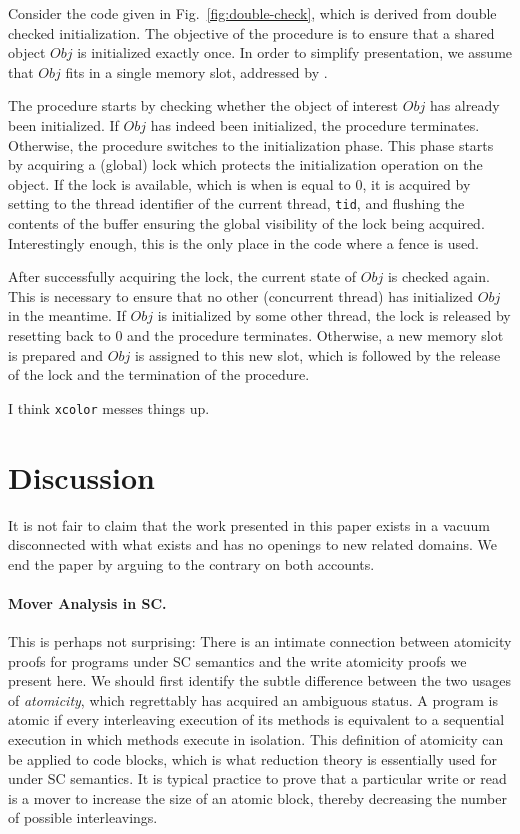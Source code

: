 \documentclass[preprint,9pt]{sigplanconf}
\begin{document}
Consider the code given in Fig.~\ref{fig:double-check}, which is derived from double checked initialization.
The objective of the procedure is to ensure that a shared object $Obj$ is initialized exactly once.
In order to simplify presentation, we assume that $Obj$ fits in a single memory slot, addressed by {}.

The procedure starts by checking whether the object of interest $Obj$ has already been initialized.
If $Obj$ has indeed been initialized, the procedure terminates.
Otherwise, the procedure switches to the initialization phase.
This phase starts by acquiring a (global) lock which protects the initialization operation on the object.
If the lock is available, which is when {} is equal to 0, it is acquired by setting {} to the thread identifier of the current thread, {\tt tid}, and flushing the contents of the buffer ensuring the global visibility of the lock being acquired.
Interestingly enough, this is the only place in the code where a fence is used.

After successfully acquiring the lock, the current state of $Obj$ is checked again.
This is necessary to ensure that no other (concurrent thread) has initialized $Obj$ in the meantime.
If $Obj$ is initialized by some other thread, the lock is released by resetting {} back to 0 and the procedure terminates.
Otherwise, a new memory slot is prepared and $Obj$ is assigned to this new slot, which is followed by the release of the lock and the termination of the procedure.

I think {\tt xcolor} messes things up.

\section{Discussion}
It is not fair to claim that the work presented in this paper exists in a vacuum disconnected with what exists and has no openings to new related domains.
We end the paper by arguing to the contrary on both accounts.

\paragraph{Mover Analysis in SC.}
This is perhaps not surprising: There is an intimate connection between atomicity proofs for programs under SC semantics and the write atomicity proofs we present here.
We should first identify the subtle difference between the two usages of {\em atomicity}, which regrettably has acquired an ambiguous status.
A program is atomic if every interleaving execution of its methods is equivalent to a sequential execution in which methods execute in isolation. 
This definition of atomicity can be applied to code blocks, which is what reduction theory is essentially used for under SC semantics.
It is typical practice to prove that a particular write or read is a mover to increase the size of an atomic block, thereby decreasing the number of possible interleavings.
\end{document}
